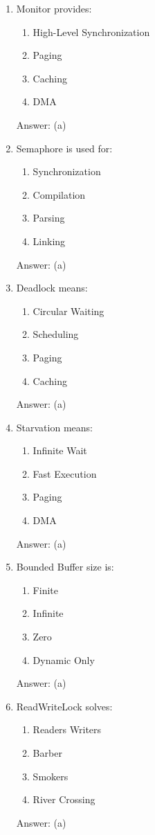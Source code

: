 \begin{enumerate}
\item Monitor provides:
\begin{enumerate}[label=(\alph*)]
\item High-Level Synchronization
\item Paging
\item Caching
\item DMA
\end{enumerate}
Answer: (a)

\item Semaphore is used for:
\begin{enumerate}[label=(\alph*)]
\item Synchronization
\item Compilation
\item Parsing
\item Linking
\end{enumerate}
Answer: (a)

\item Deadlock means:
\begin{enumerate}[label=(\alph*)]
\item Circular Waiting
\item Scheduling
\item Paging
\item Caching
\end{enumerate}
Answer: (a)

\item Starvation means:
\begin{enumerate}[label=(\alph*)]
\item Infinite Wait
\item Fast Execution
\item Paging
\item DMA
\end{enumerate}
Answer: (a)

\item Bounded Buffer size is:
\begin{enumerate}[label=(\alph*)]
\item Finite
\item Infinite
\item Zero
\item Dynamic Only
\end{enumerate}
Answer: (a)

\item ReadWriteLock solves:
\begin{enumerate}[label=(\alph*)]
\item Readers Writers
\item Barber
\item Smokers
\item River Crossing
\end{enumerate}
Answer: (a)


\end{enumerate}
